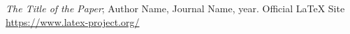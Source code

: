 \begin{thebibliography}{99}
\thispagestyle{empty} %

\emph{The Title of the Paper}; Author Name, Journal Name, year. %
Official LaTeX Site \\ \url{https://www.latex-project.org/} %

\end{thebibliography}